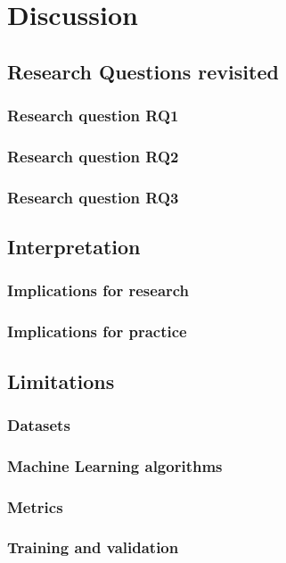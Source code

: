 \chapter{Discussion}
\label{chap:discuss}
\section{Research Questions revisited}

\subsection{Research question RQ1}
\subsection{Research question RQ2}
\subsection{Research question RQ3}

\section{Interpretation}
\subsection{Implications for research}
\subsection{Implications for practice}

\section{Limitations}
\subsection{Datasets}
\subsection{Machine Learning algorithms}
\subsection{Metrics}
\subsection{Training and validation}
